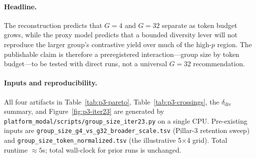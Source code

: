 \paragraph{Headline.}
The reconstruction predicts that $G{=}4$ and $G{=}32$ separate as token
budget grows, while the proxy model predicts that a bounded diversity lever
will not reproduce the larger group's contrastive yield over much of the
high-$p$ region.  The publishable claim is therefore a preregistered
interaction---group size by token budget---to be tested with direct runs,
not a universal $G{=}32$ recommendation.

\paragraph{Inputs and reproducibility.}
All four artifacts in Table~\ref{tab:p3-pareto}, Table~\ref{tab:p3-crossings},
the $\delta_\text{div}$ summary, and Figure~\ref{fig:p3-iter23} are generated by
\texttt{platform\_modal/scripts/group\_size\_iter23.py} on a single CPU.
Pre-existing inputs are
\texttt{group\_size\_g4\_vs\_g32\_broader\_scale.tsv} (Pillar-3 retention sweep)
and \texttt{group\_size\_token\_normalized.tsv} (the illustrative 5$\times$4 grid).
Total runtime $\!\approx\!5$s; total wall-clock for prior runs is unchanged.
